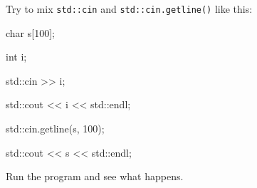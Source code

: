 Try to mix \texttt{std::cin} and \texttt{std::cin.getline()} like this:

\begin{consolethree}[escapeinside=||]

char s[100];

int i;

std::cin >> i;

std::cout << i << std::endl;

std::cin.getline(s, 100);

std::cout << s << std::endl;

\end{consolethree}



Run the program and see what happens.

